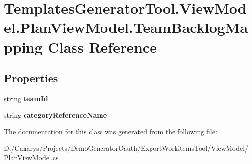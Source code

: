 \hypertarget{class_templates_generator_tool_1_1_view_model_1_1_plan_view_model_1_1_team_backlog_mapping}{}\section{Templates\+Generator\+Tool.\+View\+Model.\+Plan\+View\+Model.\+Team\+Backlog\+Mapping Class Reference}
\label{class_templates_generator_tool_1_1_view_model_1_1_plan_view_model_1_1_team_backlog_mapping}
\subsection*{Properties}
\begin{DoxyCompactItemize}
\item 
\mbox{\label{class_templates_generator_tool_1_1_view_model_1_1_plan_view_model_1_1_team_backlog_mapping_a6485f2467b6670016e041947b9a25a66}} 
string {\bfseries team\+Id}
\item 
\mbox{\label{class_templates_generator_tool_1_1_view_model_1_1_plan_view_model_1_1_team_backlog_mapping_a77ab4b00c2ac02662e10844b6ea36e6f}} 
string {\bfseries category\+Reference\+Name}
\end{DoxyCompactItemize}


The documentation for this class was generated from the following file\+:\begin{DoxyCompactItemize}
\item 
D\+:/\+Canarys/\+Projects/\+Demo\+Generator\+Oauth/\+Export\+Workitems\+Tool/\+View\+Model/Plan\+View\+Model.\+cs\end{DoxyCompactItemize}
